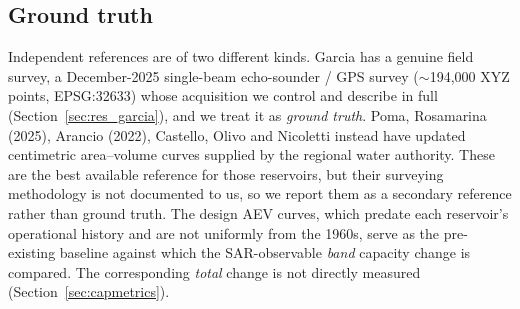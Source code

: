 \subsection{Ground truth}
Independent references are of two different kinds. Garcia has a genuine field survey, a
December-2025 single-beam echo-sounder / GPS survey ($\sim$194{,}000 XYZ points,
EPSG:32633) whose acquisition we control and describe in full
(Section~\ref{sec:res_garcia}), and we treat it as \emph{ground truth}. Poma, Rosamarina
(2025), Arancio (2022), Castello, Olivo and Nicoletti instead have updated centimetric
area--volume curves supplied by the regional water authority. These are the best
available reference for those reservoirs, but their surveying methodology is not
documented to us, so we report them as a secondary reference rather than ground truth.
The design AEV curves, which predate each reservoir's operational history and are not
uniformly from the 1960s, serve as the pre-existing baseline against which the
SAR-observable \emph{band} capacity change is compared. The corresponding \emph{total}
change is not directly measured (Section~\ref{sec:capmetrics}).
